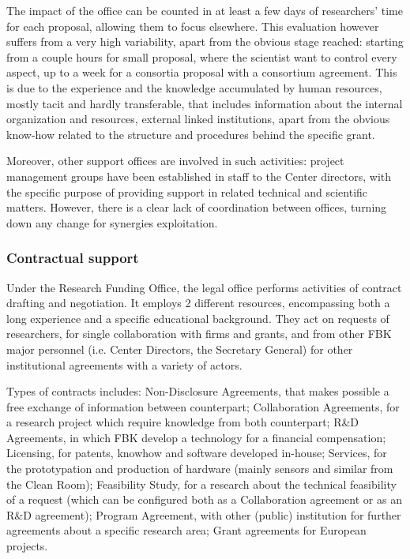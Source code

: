 The impact of the office can be counted in at least a few days of researchers’ time for each proposal, allowing them to focus elsewhere. This evaluation however suffers from a very high variability, apart from the obvious stage reached: starting from a couple hours for small proposal, where the scientist want to control every aspect, up to a week for a consortia proposal with a consortium agreement. This is due to the experience and the knowledge accumulated by human resources, mostly tacit and hardly transferable, that includes information about the internal organization and resources, external linked institutions, apart from the obvious know-how related to the structure and procedures behind the specific grant. 

Moreover, other support offices are involved in such activities: project management groups have been established in staff to the Center directors, with the specific purpose of providing support in related technical and scientific matters. However, there is a clear lack of coordination between offices, turning down any change for synergies exploitation.

\subsubsection{Contractual support}

Under the Research Funding Office, the legal office performs activities of contract drafting and negotiation. It employs 2 different resources, encompassing both a long experience and a specific educational background. They act on requests of researchers, for single collaboration with firms and grants, and from other FBK major personnel (i.e. Center Directors, the Secretary General) for other institutional agreements with a variety of actors.

Types of contracts includes: Non-Disclosure Agreements, that makes possible a free exchange of information between counterpart; Collaboration Agreements, for a research project which require knowledge from both counterpart; R\&D Agreements, in which FBK develop a technology for a financial compensation; Licensing, for patents, knowhow and software developed in-house; Services, for the prototypation and production of hardware (mainly sensors and similar from the Clean Room); Feasibility Study, for a research about the technical feasibility of a request (which can be configured both as a Collaboration agreement or as an R\&D agreement); Program Agreement, with other (public) institution for further agreements about a specific research area; Grant agreements for European projects. 

